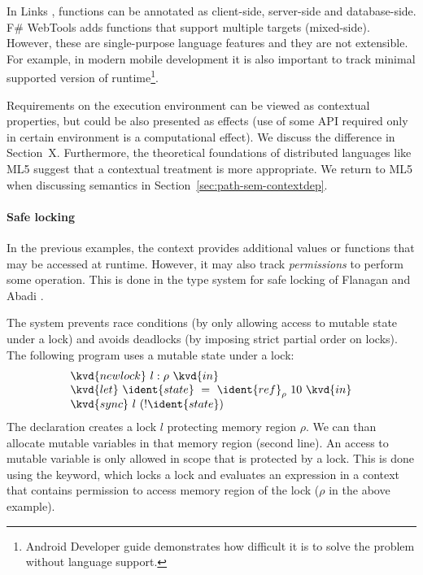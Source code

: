 In Links \cite{app-distributed-links}, functions can be annotated as client-side, server-side
and database-side. F\# WebTools \cite{app-fsharp-webtools} adds functions that support multiple
targets (mixed-side). However, these are single-purpose language features and they are not 
extensible. For example, in modern mobile development it is also important to track minimal 
supported version of runtime\footnote{Android Developer guide \cite{app-android-multitarget} 
demonstrates how difficult it is to solve the problem without language support.}. 

Requirements on the execution environment can be viewed as contextual properties, but could be
also presented as effects (use of some API required only in certain environment is a computational
effect). We discuss the difference in Section~X. Furthermore, the theoretical foundations of
distributed languages like ML5 \cite{app-distributed-ml5} suggest that a contextual treatment
is more appropriate. We return to ML5 when discussing semantics in Section~\ref{sec:path-sem-contextdep}.


\paragraph{Safe locking}
In the previous examples, the context provides additional values or functions that may be accessed
at runtime. However, it may also track \emph{permissions} to perform some operation. This is done
in the type system for safe locking of Flanagan and Abadi \cite{app-safe-locking}.

The system prevents race conditions (by only allowing access to mutable state under a lock)
and avoids deadlocks (by imposing strict partial order on locks). The following 
program uses a mutable state under a lock:
%
\begin{equation*}
\begin{array}{l}
\kvd{newlock}~l:\rho~\kvd{in}\\
\kvd{let}~\ident{state}~=~\ident{ref}_\rho~10~\kvd{in}\\
\kvd{sync}~l~(!\ident{state})
\end{array}
\end{equation*}
%
The declaration  creates a lock $l$ protecting memory region $\rho$. We can than
allocate mutable variables in that memory region (second line). An access to mutable variable
is only allowed in scope that is protected by a lock. This is done using the  keyword,
which locks a lock and evaluates an expression in a context that contains permission to access
memory region of the lock ($\rho$ in the above example).


